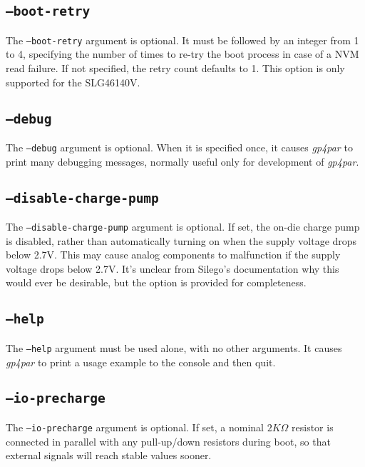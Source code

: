 \documentclass[11pt]{article}
\newcommand{\namestyle}[1]{\textit{#1}}
\begin{document}
\subsection{\texttt{--boot-retry}}

The \texttt{--boot-retry} argument is optional. It must be followed by an integer from 1 to 4, specifying the number of times
to re-try the boot process in case of a NVM read failure. If not specified, the retry count defaults to 1. This option is
only supported for the SLG46140V.

\subsection{\texttt{--debug}}

The \texttt{--debug} argument is optional. When it is specified once, it causes \namestyle{gp4par} to print
many debugging messages, normally useful only for development of \namestyle{gp4par}.

\subsection{\texttt{--disable-charge-pump}}

The \texttt{--disable-charge-pump} argument is optional. If set, the on-die charge pump is disabled, rather than
automatically turning on when the supply voltage drops below 2.7V. This may cause analog components to malfunction if the
supply voltage drops below 2.7V. It's unclear from Silego's documentation why this would ever be desirable, but the option
is provided for completeness.

\subsection{\texttt{--help}}

The \texttt{--help} argument must be used alone, with no other arguments. It causes \namestyle{gp4par} to print a usage
example to the console and then quit.

\subsection{\texttt{--io-precharge}}

The \texttt{--io-precharge} argument is optional. If set, a nominal $2K \Omega$ resistor is connected in parallel with any
pull-up/down resistors during boot, so that external signals will reach stable values sooner.
\end{document}
